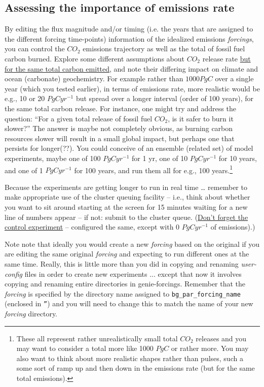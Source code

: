 
\subsection{Assessing the importance of emissions rate}

By editing the flux magnitude and/or timing (i.e. the years that are assigned to the different forcing time-points) information of the idealized emissions \textit{forcings}, you can control the \(CO_{2}\) emissions trajectory as well as the total of fossil fuel carbon burned. Explore some different assumptions about \(CO_{2}\) release rate \uline{but for the same total carbon emitted}, and note their differing impact on climate and ocean (carbonate) geochemistry. For example rather than $1000 PgC$ over a single year (which you tested earlier), in terms of emissions rate, more realistic would be e.g., 10 or 20 \(PgCyr^{-1}\) but spread over a longer interval (order of 100 years), for the same total carbon release. For instance, one might try and address the question: “For a given total release of  fossil fuel \(CO_{2}\), is it safer to burn it slower?” The answer is maybe not completely obvious, as burning carbon resources slower will result in a small global impact, but perhaps one that persists for longer(??). You could conceive of an ensemble (related set) of model experiments, maybe one of 100 \(PgCyr^{-1}\) for 1 yr, one of 10 \(PgCyr^{-1}\) for 10 years, and one of 1 \(PgCyr^{-1}\) for 100 years, and run them all for e.g., 100 years.\footnote{These all represent rather unrealistically small total \(CO_{2}\) releases and you may want to consider a total more like 1000 \(PgC\) or rather more. You may also want to think about more realistic shapes rather than pulses, such a some sort of ramp up and then down in the emissions rate (but for the same total emissions).}

Because the experiments are getting longer to run in real time … remember to make appropriate use of the cluster queuing facility – i.e., think about whether you want to sit around starting at the screen for 15 minutes waiting for a new line of numbers appear – if not: submit to the cluster queue. (\uline{Don’t forget the control experiment} -- configured the same, except with 0 \(PgCyr^{-1}\) of emissions).)

\vspace{1mm}

Note note that ideally you would create a new \textit{forcing} based on the original if you are editing the same original  \textit{forcing} and expecting to run different ones at the same time. Really, this is little more than you did in copying and renaming \textit{user-config} files in order to create new experiments ... except that now it involves copying and renaming entire directories in \textsf{\footnotesize genie-forcings}. Remember that the \textit{forcing} is specified by the directory name assigned to \texttt{bg\_par\_forcing\_name} (enclosed in \texttt{''}) and you will need to change this to match the name of your new \textit{forcing} directory.

